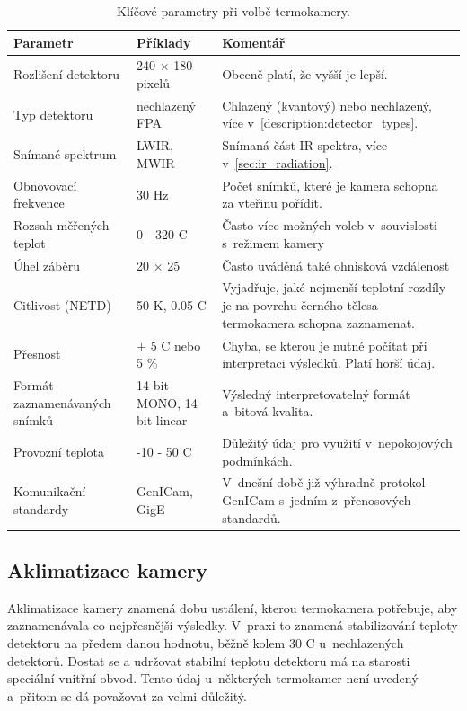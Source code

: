 \begin{table}[h]
	\centering
    \begin{tabular}{|p{4.5cm}|p{3cm}|p{6cm}|}
      \hline
      \rowcolor{Blue}
      \color{White}\textbf{Parametr} & \color{White}\textbf{Příklady} & \color{White}\textbf{Komentář}   \\ \hline
      Rozlišení detektoru & 240 $\times$ 180 pixelů &  Obecně platí, že vyšší je lepší. \\  \hline
      Typ detektoru & nechlazený FPA & Chlazený (kvantový) nebo nechlazený, více v~\ref{description:detector_types}.\\  \hline
      Snímané spektrum & LWIR, MWIR & Snímaná část IR spektra, více v~\ref{sec:ir_radiation}. \\ \hline
      Obnovovací frekvence & 30 Hz &  Počet snímků, které je kamera schopna za vteřinu pořídit. \\ \hline
      Rozsah měřených teplot & 0 - 320 \textdegree{}C & Často více možných voleb v~souvislosti s~režimem kamery \\ \hline
      Úhel záběru & 20\textdegree{} $\times$ 25\textdegree{} & Často uváděná také ohnisková vzdálenost \\ \hline
      Citlivost (NETD) & 50 K, 0.05 \textdegree{}C & Vyjadřuje, jaké nejmenší teplotní rozdíly je na povrchu černého tělesa termokamera schopna zaznamenat. \\ \hline
      Přesnost &  $\pm$ 5 \textdegree{}C nebo 5 \% & Chyba, se kterou je nutné počítat při interpretaci výsledků. Platí horší údaj. \\ \hline
      Formát zaznamenávaných snímků & 14 bit MONO, 14 bit linear  & Výsledný interpretovatelný formát a~bitová kvalita. \\ \hline
      Provozní teplota & -10 - 50 \textdegree{}C & Důležitý údaj pro využití v~nepokojových podmínkách.\\ \hline
      Komunikační standardy & GenICam, GigE &  V~dnešní době již výhradně protokol GenICam s~jedním z~přenosových standardů. \\  \hline
    \end{tabular}
    \caption{Klíčové parametry při volbě termokamery.}
    \label{table:thermal_camera_features}
\end{table}
    
    \subsection{Aklimatizace kamery}
     Aklimatizace kamery znamená dobu ustálení, kterou termokamera potřebuje, aby zaznamenávala co nejpřesnější výsledky. V~praxi to znamená stabilizování teploty detektoru na předem danou hodnotu, běžně kolem 30 \textdegree{}C u~nechlazených detektorů. Dostat se a udržovat stabilní teplotu detektoru má na starosti speciální vnitřní obvod. Tento údaj u~některých termokamer není uvedený a~přitom se dá považovat za velmi důležitý.

